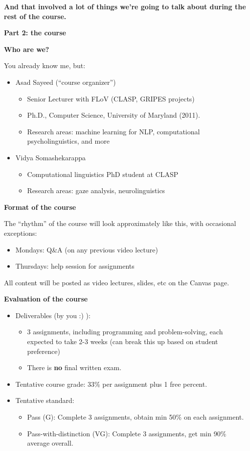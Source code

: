 \documentclass{beamer}
\newcommand{\placard}[1]{
  \begin{frame}
    \begin{center}
      \huge
      \textbf{#1}
    \end{center}
  \end{frame}
}
\newcommand{\pagestepalt}[2]{
  \begin{frame}[t]
    \begin{minipage}[t][0.26\textheight][t]{\textwidth}
      \begin{center}
        \huge
        \textbf{#1}
      \end{center}
    \end{minipage}
    
    \begin{minipage}[t][0.7\textheight][c]{\textwidth}
      #2
    \end{minipage}
  \end{frame}
}
\begin{document}
\placard{And that involved a lot of things we're going to talk about during the rest of the course.}

\placard{Part 2: the course}

\pagestepalt{Who are we?}{
  You already know me, but:\pause
  \begin{itemize}
  \item Asad Sayeed (``course organizer'')
    \begin{itemize}
    \item Senior Lecturer with FLoV (CLASP, GRIPES projects)
    \item Ph.D., Computer Science, University of Maryland (2011).
    \item Research areas: machine learning for NLP, computational psycholinguistics, and more
    \end{itemize}\pause
  \item Vidya Somashekarappa
    \begin{itemize}
    \item Computational linguistics PhD student at CLASP
    \item Research areas: gaze analysis, neurolinguistics
    \end{itemize}
  \end{itemize}
}


\pagestepalt{Format of the course}{
  The ``rhythm'' of the course will look approximately like this, with occasional exceptions:
  \begin{itemize}
  \item Mondays: Q\&A (on any previous video lecture)
  \item Thursdays: help session for assignments
  \end{itemize}
  All content will be posted as video lectures, slides, etc on the Canvas page.
}

\pagestepalt{Evaluation of the course}{
  \begin{itemize}
  \item Deliverables (by you :) ):
    \begin{itemize}
    \item 3 assignments, including programming and problem-solving, each expected to take 2-3 weeks (can break this up based on student preference)
    \item There is \alert{\textbf{no}} final written exam.
    \end{itemize}
  \item Tentative course grade: 33\% per assignment plus 1 free percent.
  \item Tentative standard:
    \begin{itemize}
    \item Pass (G): Complete 3 assignments, obtain min 50\% on each assignment.
    \item Pass-with-distinction (VG): Complete 3 assignments, get min 90\% average overall.
    \end{itemize}
  \end{itemize}
}
\end{document}
